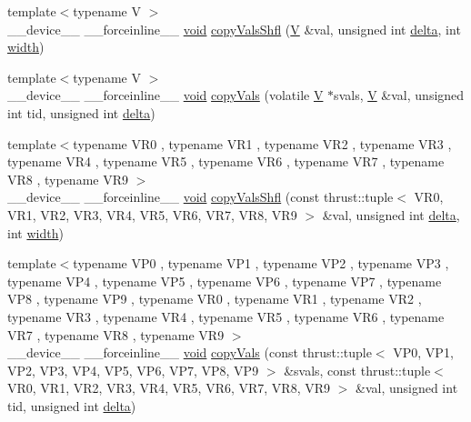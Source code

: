 \begin{DoxyCompactItemize}
\item 
{\footnotesize template$<$typename V $>$ }\\\-\_\-\-\_\-device\-\_\-\-\_\- \-\_\-\-\_\-forceinline\-\_\-\-\_\- \hyperlink{legacy_8hpp_a8bb47f092d473522721002c86c13b94e}{void} \hyperlink{namespacecv_1_1gpu_1_1device_1_1reduce__key__val__detail_aed43794ec9cbb892e897b2ea7f650107}{copy\-Vals\-Shfl} (\hyperlink{core__c_8h_ad8dd4fff0e3910932187b6de0543cae1}{V} \&val, unsigned int \hyperlink{legacy_8hpp_ac867054f00f4be8b1f3ebce6fba31982}{delta}, int \hyperlink{highgui__c_8h_a2474a5474cbff19523a51eb1de01cda4}{width})
\item 
{\footnotesize template$<$typename V $>$ }\\\-\_\-\-\_\-device\-\_\-\-\_\- \-\_\-\-\_\-forceinline\-\_\-\-\_\- \hyperlink{legacy_8hpp_a8bb47f092d473522721002c86c13b94e}{void} \hyperlink{namespacecv_1_1gpu_1_1device_1_1reduce__key__val__detail_a473a4c406d4a535ae7c751b382f3c844}{copy\-Vals} (volatile \hyperlink{core__c_8h_ad8dd4fff0e3910932187b6de0543cae1}{V} $\ast$svals, \hyperlink{core__c_8h_ad8dd4fff0e3910932187b6de0543cae1}{V} \&val, unsigned int tid, unsigned int \hyperlink{legacy_8hpp_ac867054f00f4be8b1f3ebce6fba31982}{delta})
\item 
{\footnotesize template$<$typename V\-R0 , typename V\-R1 , typename V\-R2 , typename V\-R3 , typename V\-R4 , typename V\-R5 , typename V\-R6 , typename V\-R7 , typename V\-R8 , typename V\-R9 $>$ }\\\-\_\-\-\_\-device\-\_\-\-\_\- \-\_\-\-\_\-forceinline\-\_\-\-\_\- \hyperlink{legacy_8hpp_a8bb47f092d473522721002c86c13b94e}{void} \hyperlink{namespacecv_1_1gpu_1_1device_1_1reduce__key__val__detail_a4ebb2f3bed56d0456fe2b205f98d0f10}{copy\-Vals\-Shfl} (const thrust\-::tuple$<$ V\-R0, V\-R1, V\-R2, V\-R3, V\-R4, V\-R5, V\-R6, V\-R7, V\-R8, V\-R9 $>$ \&val, unsigned int \hyperlink{legacy_8hpp_ac867054f00f4be8b1f3ebce6fba31982}{delta}, int \hyperlink{highgui__c_8h_a2474a5474cbff19523a51eb1de01cda4}{width})
\item 
{\footnotesize template$<$typename V\-P0 , typename V\-P1 , typename V\-P2 , typename V\-P3 , typename V\-P4 , typename V\-P5 , typename V\-P6 , typename V\-P7 , typename V\-P8 , typename V\-P9 , typename V\-R0 , typename V\-R1 , typename V\-R2 , typename V\-R3 , typename V\-R4 , typename V\-R5 , typename V\-R6 , typename V\-R7 , typename V\-R8 , typename V\-R9 $>$ }\\\-\_\-\-\_\-device\-\_\-\-\_\- \-\_\-\-\_\-forceinline\-\_\-\-\_\- \hyperlink{legacy_8hpp_a8bb47f092d473522721002c86c13b94e}{void} \hyperlink{namespacecv_1_1gpu_1_1device_1_1reduce__key__val__detail_a61ce0f5d726c43459f2dbe9c67a5f95c}{copy\-Vals} (const thrust\-::tuple$<$ V\-P0, V\-P1, V\-P2, V\-P3, V\-P4, V\-P5, V\-P6, V\-P7, V\-P8, V\-P9 $>$ \&svals, const thrust\-::tuple$<$ V\-R0, V\-R1, V\-R2, V\-R3, V\-R4, V\-R5, V\-R6, V\-R7, V\-R8, V\-R9 $>$ \&val, unsigned int tid, unsigned int \hyperlink{legacy_8hpp_ac867054f00f4be8b1f3ebce6fba31982}{delta})

\end{DoxyCompactItemize}
